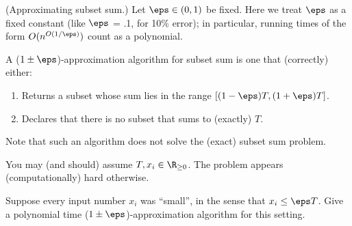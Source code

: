 \documentclass{article}
\begin{document}
\setcounter{section}{11}
\setcounter{exercise}{8}

 (Approximating subset sum.) Let \( \eps\in (0, 1) \) be fixed.
Here we treat \( \eps \) as a fixed constant (like \( \eps \) = .1, for 10\% error); in particular, running times of the form \( O(n^{O(1/\eps)}) \) count as a polynomial.

A (\( 1 \pm \eps \))-approximation algorithm for subset sum is one that (correctly) either: \begin{enumerate}
  \item Returns a subset whose sum lies in the range \( [( 1-\eps )T , ( 1+\eps )T ] \).
  \item Declares that there is no subset that sums to (exactly) \( T \).
\end{enumerate}
Note that such an algorithm does not solve the (exact) subset sum problem.

\begin{note}
  You may (and should) assume \( T,x_i\in\R_{\geq 0} \). The problem appears (computationally) hard otherwise.
\end{note}


\begin{subexercise}\label{qs:small}
  Suppose every input number \( x_i \) was ``small'', in the sense that \( x_i \leq \eps T \). Give a polynomial time (\( 1\pm \eps \))-approximation algorithm for this setting.
\end{subexercise}
\end{document}
